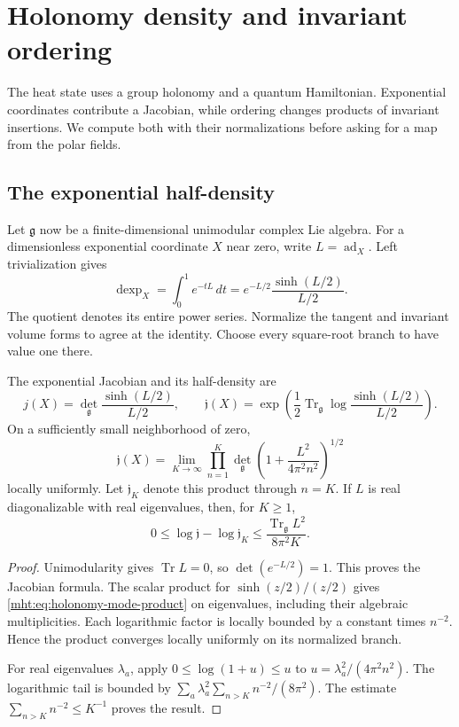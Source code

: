 \section{Holonomy density and invariant ordering}

The heat state uses a group holonomy and a quantum Hamiltonian.
Exponential coordinates contribute a Jacobian, while ordering
changes products of invariant insertions. We compute both with
their normalizations before asking for a map from the polar fields.

\subsection{The exponential half-density}

Let $\mathfrak g$ now be a finite-dimensional unimodular complex
Lie algebra. For a dimensionless exponential coordinate $X$ near
zero, write $L=\operatorname{ad}_X$. Left trivialization gives
\[
 \operatorname{dexp}_X=\int_0^1e^{-tL}\,dt
          =e^{-L/2}\frac{\sinh(L/2)}{L/2}.
\]
The quotient denotes its entire power series. Normalize the
tangent and invariant volume forms to agree at the identity.
Choose every square-root branch to have value one there.

\begin{proposition}\label{mht:prop:holonomy-half-density}
The exponential Jacobian and its half-density are
\begin{equation}\label{mht:eq:holonomy-half-density}
 j(X)=\det_{\mathfrak g}\frac{\sinh(L/2)}{L/2},\qquad
 \mathfrak j(X)=\exp\!\left(
 \frac12\operatorname{Tr}_{\mathfrak g}
                         \log\frac{\sinh(L/2)}{L/2}\right).
\end{equation}
On a sufficiently small neighborhood of zero,
\begin{equation}\label{mht:eq:holonomy-mode-product}
 \mathfrak j(X)=\lim_{K\to\infty}
 \prod_{n=1}^K\det_{\mathfrak g}
       \left(1+\frac{L^2}{4\pi^2n^2}\right)^{1/2}
\end{equation}
locally uniformly. Let $\mathfrak j_K$ denote this product through $n=K$.
If $L$ is real diagonalizable with real
eigenvalues, then, for $K\geq1$,
\begin{equation}\label{mht:eq:holonomy-mode-tail}
 0\leq\log\mathfrak j-\log\mathfrak j_K
       \leq\frac{\operatorname{Tr}_{\mathfrak g}L^2}{8\pi^2K}.
\end{equation}
\end{proposition}

\begin{proof}
Unimodularity gives $\operatorname{Tr}L=0$, so
$\det(e^{-L/2})=1$. This proves the Jacobian formula.
The scalar product for $\sinh(z/2)/(z/2)$ gives
\eqref{mht:eq:holonomy-mode-product} on eigenvalues, including
their algebraic multiplicities. Each logarithmic factor is
locally bounded by a constant times $n^{-2}$. Hence the
product converges locally uniformly on its normalized branch.

For real eigenvalues $\lambda_a$, apply
$0\leq\log(1+u)\leq u$ to
$u=\lambda_a^2/(4\pi^2n^2)$. The logarithmic tail is bounded by
$\sum_a\lambda_a^2\sum_{n>K}n^{-2}/(8\pi^2)$.
The estimate $\sum_{n>K}n^{-2}\leq K^{-1}$ proves the result.
\end{proof}

